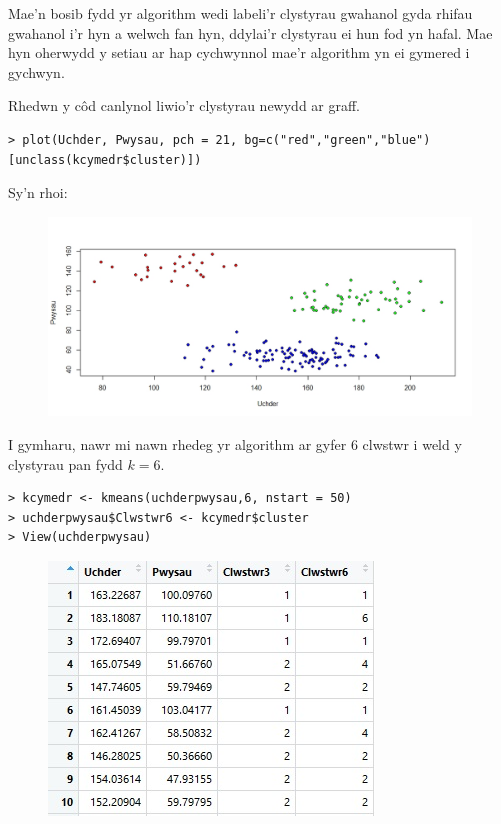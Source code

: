 Mae'n bosib fydd yr algorithm wedi labeli'r clystyrau gwahanol gyda rhifau gwahanol i'r hyn a welwch fan hyn, ddylai'r clystyrau ei hun fod yn hafal. Mae hyn oherwydd y setiau ar hap cychwynnol mae'r algorithm yn ei gymered i gychwyn.

Rhedwn y c\^{o}d canlynol liwio'r clystyrau newydd ar graff.

\begin{verbatim}
> plot(Uchder, Pwysau, pch = 21, bg=c("red","green","blue")[unclass(kcymedr$cluster)])
\end{verbatim}

Sy'n rhoi:

\begin{figure}[H]
\begin{center}
\includegraphics[width=0.5\linewidth]{../img/3clwstwrR.jpeg}
\end{center}
\end{figure}

I gymharu, nawr mi nawn rhedeg yr algorithm ar gyfer 6 clwstwr i weld y clystyrau pan fydd $k=6$. 

\begin{verbatim}
> kcymedr <- kmeans(uchderpwysau,6, nstart = 50)
> uchderpwysau$Clwstwr6 <- kcymedr$cluster
> View(uchderpwysau)
\end{verbatim}

\begin{figure}[H]
\begin{center}
\includegraphics[width=0.5\linewidth]{../img/Data6_yn_R.jpg}
\end{center}
\end{figure}

